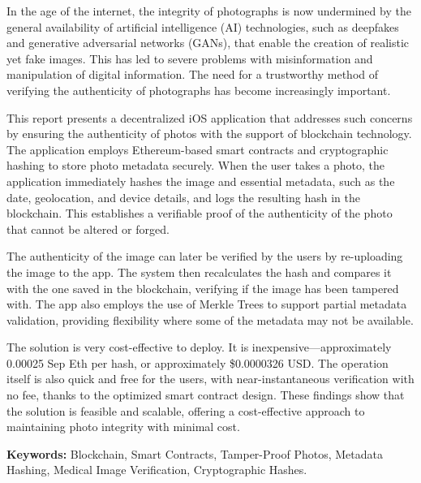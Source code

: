 In the age of the internet, the integrity of photographs is now undermined by the general availability of artificial intelligence (AI) technologies, such as deepfakes and generative adversarial networks (GANs), that enable the creation of realistic yet fake images. This has led to severe problems with misinformation and manipulation of digital information. The need for a trustworthy method of verifying the authenticity of photographs has become increasingly important.

This report presents a decentralized iOS application that addresses such concerns by ensuring the authenticity of photos with the support of blockchain technology. The application employs Ethereum-based smart contracts and cryptographic hashing to store photo metadata securely. When the user takes a photo, the application immediately hashes the image and essential metadata, such as the date, geolocation, and device details, and logs the resulting hash in the blockchain. This establishes a verifiable proof of the authenticity of the photo that cannot be altered or forged.

The authenticity of the image can later be verified by the users by re-uploading the image to the app. The system then recalculates the hash and compares it with the one saved in the blockchain, verifying if the image has been tampered with. The app also employs the use of Merkle Trees to support partial metadata validation, providing flexibility where some of the metadata may not be available.

The solution is very cost-effective to deploy. It is inexpensive—approximately 0.00025 Sep Eth per hash, or approximately \$0.0000326 USD. The operation itself is also quick and free for the users, with near-instantaneous verification with no fee, thanks to the optimized smart contract design. These findings show that the solution is feasible and scalable, offering a cost-effective approach to maintaining photo integrity with minimal cost.

{\bf Keywords:} Blockchain, Smart Contracts, Tamper-Proof Photos, Metadata Hashing, Medical Image Verification, Cryptographic Hashes.

